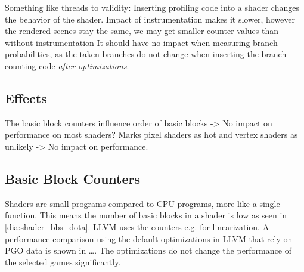 \clearpage
{}
Something like threads to validity: Inserting profiling code into a shader changes the behavior of the shader.
Impact of instrumentation makes it slower, however the rendered scenes stay the same, we may get smaller counter values than without instrumentation
It should have no impact when measuring branch probabilities, as the taken branches do not change when inserting the branch counting code \emph{after optimizations}.

\subsection{Effects}
\label{sub:effets}
The basic block counters influence order of basic blocks -> No impact on performance on most shaders?
Marks pixel shaders as hot and vertex shaders as unlikely -> No impact on performance.

\subsection{Basic Block Counters}
\label{sub:evaluation_counters}
Shaders are small programs compared to CPU programs, more like a single function. This means the number of basic blocks in a shader is low as seen in \cref{dia:shader_bbs_dota}.
LLVM uses the counters e.g. for linearization. A performance comparison using the default optimizations in LLVM that rely on PGO data is shown in \dots. The optimizations do not change the performance of the selected games significantly.

\begin{figure}
\pgfplotsset{width=\textwidth}
\centering
\begin{minipage}[t]{.45\textwidth}
\centering
{}
\label{dia:shader_bbs_dota}
\end{minipage}\qquad
\begin{minipage}[t]{.45\textwidth}
\centering
{}
\label{dia:shader_bbs_ashes}
\end{minipage}
\end{figure}

